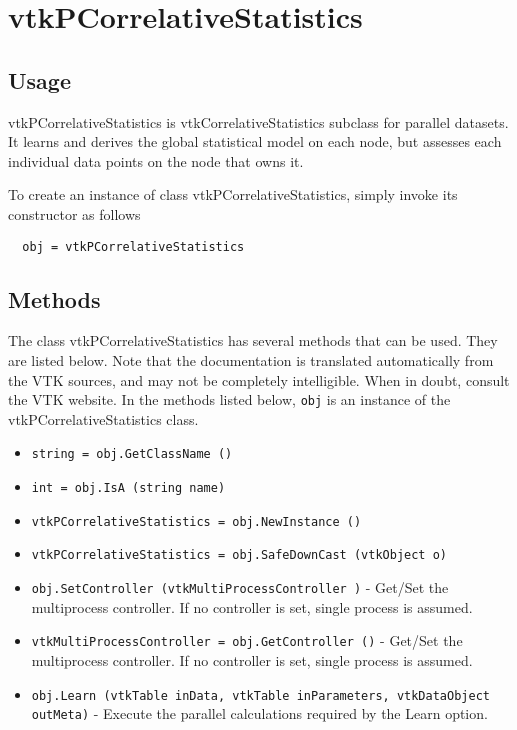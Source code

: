 \section{vtkPCorrelativeStatistics}

\subsection{Usage}

 vtkPCorrelativeStatistics is vtkCorrelativeStatistics subclass for parallel datasets.
 It learns and derives the global statistical model on each node, but assesses each 
 individual data points on the node that owns it.

To create an instance of class vtkPCorrelativeStatistics, simply
invoke its constructor as follows
\begin{verbatim}
  obj = vtkPCorrelativeStatistics
\end{verbatim}
\subsection{Methods}

The class vtkPCorrelativeStatistics has several methods that can be used.
  They are listed below.
Note that the documentation is translated automatically from the VTK sources,
and may not be completely intelligible.  When in doubt, consult the VTK website.
In the methods listed below, \verb|obj| is an instance of the vtkPCorrelativeStatistics class.
\begin{itemize}
\item  \verb|string = obj.GetClassName ()|

\item  \verb|int = obj.IsA (string name)|

\item  \verb|vtkPCorrelativeStatistics = obj.NewInstance ()|

\item  \verb|vtkPCorrelativeStatistics = obj.SafeDownCast (vtkObject o)|

\item  \verb|obj.SetController (vtkMultiProcessController )| -  Get/Set the multiprocess controller. If no controller is set,
 single process is assumed.

\item  \verb|vtkMultiProcessController = obj.GetController ()| -  Get/Set the multiprocess controller. If no controller is set,
 single process is assumed.

\item  \verb|obj.Learn (vtkTable inData, vtkTable inParameters, vtkDataObject outMeta)| -  Execute the parallel calculations required by the Learn option.

\end{itemize}
